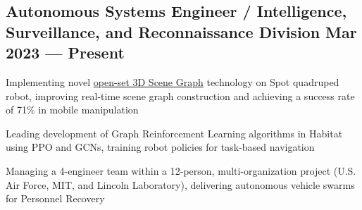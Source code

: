 \subsection{{Autonomous Systems Engineer / Intelligence, Surveillance, and Reconnaissance Division \hfill Mar 2023 --- Present}}
\begin{zitemize}
	\item Implementing novel  \href{https://ieeexplore.ieee.org/document/10659066}{open-set 3D Scene Graph} technology on Spot quadruped robot, improving real-time scene graph construction and achieving a success rate of 71\% in mobile manipulation
	\item Leading development of Graph Reinforcement Learning algorithms in Habitat using PPO and GCNs, training robot policies for task-based navigation
	\item Managing a 4-engineer team within a 12-person, multi-organization project (U.S. Air Force, MIT, and Lincoln Laboratory), delivering autonomous vehicle swarms for Personnel Recovery

\end{zitemize}
